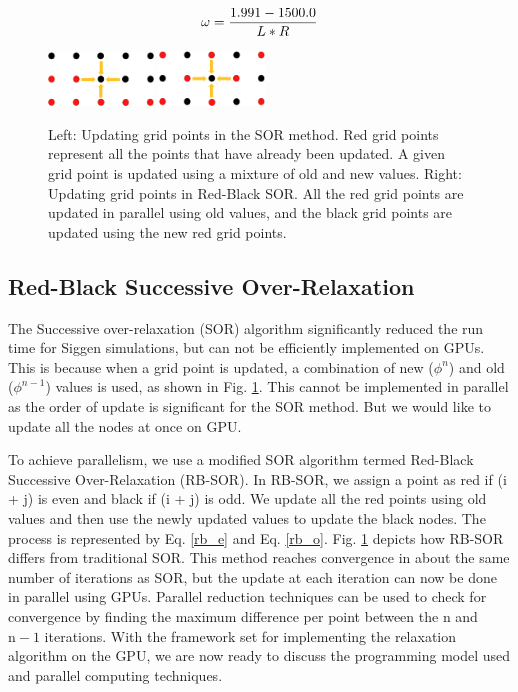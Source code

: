 \begin{equation}{\label{omg}}
\omega = \frac{1.991 - 1500.0}{L*R}
\end{equation}

\begin{figure}
\centering
\includegraphics[width=0.25\textwidth]{ch4/figs/SOR.png}
\hspace{1 cm}
 \includegraphics[width=0.25\textwidth]{ch4/figs/RB-SOR.png}
\caption{\label{fig: sor_methods} Left: Updating grid points in the SOR method. Red grid points represent all the points that have already been updated. A given grid point is updated using a mixture of old and new values. Right: Updating grid points in Red-Black SOR. All the red grid points are updated in parallel using old values, and the black grid points are updated using the new red grid points.}
\end{figure}



\subsection{Red-Black Successive Over-Relaxation}

The Successive over-relaxation (SOR) algorithm significantly reduced the run time for Siggen simulations, but can not be efficiently implemented on GPUs. This is because when a grid point is updated, a combination of new ($\phi^{n}$) and old ($\phi^{n-1}$) values is used, as shown in Fig. \ref{fig: sor_methods}. This cannot be implemented in parallel as the order of update is significant for the SOR method. But we would like to update all the nodes at once on GPU.

To achieve parallelism, we use a modified SOR algorithm termed Red-Black Successive Over-Relaxation (RB-SOR)\cite{RB_SOR_paper}. In RB-SOR, we assign a point as red if (i + j) is even and black if (i + j) is odd. We update all the red points using old values and then use the newly updated values to update the black nodes. The process is represented by Eq. \ref{rb_e} and Eq. \ref{rb_o}. Fig. \ref{fig: sor_methods} depicts how RB-SOR differs from traditional SOR. This method reaches convergence in about the same number of iterations as SOR, but the update at each iteration can now be done in parallel using GPUs. Parallel reduction techniques can be used to check for convergence by finding the maximum difference per point between the $\text{n}$ and $\text{n}-1$ iterations. With the framework set for implementing the relaxation algorithm on the GPU, we are now ready to discuss the programming model used and parallel computing techniques.

